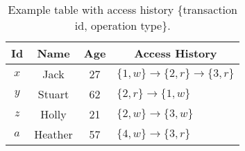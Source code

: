 \begin{table}[htbp]
    \centering
    \caption{Example table with access history \{transaction id, operation type\}.}
    \begin{tabular}{|c|c|c|l|}
    \hline
   Id   & Name    & Age   & \multicolumn{1}{|c|}{Access History}                  \\ \hline
   $x$  & Jack    & 27    & $\{1,w\} \rightarrow \{2,r\} \rightarrow \{3,r\} $    \\ \hline
   $y$  & Stuart  & 62    & $\{2,r\} \rightarrow \{1,w\} $                        \\ \hline
   $z$  & Holly   & 21    & $\{2,w\} \rightarrow \{3,w\} $                        \\ \hline
   $a$  & Heather & 57    & $\{4,w\} \rightarrow \{3,r\} $                        \\ \hline
    \end{tabular}
    \label{fig:conflict-detection}
\end{table}
